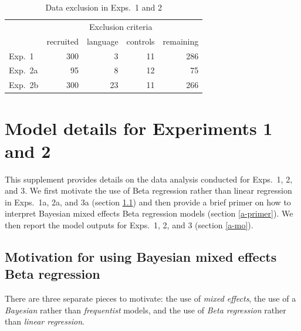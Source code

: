 \documentclass[11pt,fleqn]{article}
\newcommand{\6}{\mbox{$[\hspace*{-.6mm}[$}}
\newcommand{\9}{\mbox{$]\hspace*{-.6mm}]$}}
\begin{document}

\begin{table}[h!]
\centering
\begin{tabular}{l r | r r | r}
&  & \multicolumn{2}{c|}{Exclusion criteria} &  \\ 
&  recruited  & language & controls & remaining \\ 
\hline
Exp.~1 & 300 & 3 & 11 & 286 \\
Exp.~2a & 95 & 8 & 12 & 75 \\
Exp.~2b & 300 & 23 & 11 & 266 \\
\end{tabular}
\caption{Data exclusion in Exps.~1 and 2}\label{f-exclusion}
\end{table} 

\section{Model details for Experiments 1 and 2}\label{modeldetails}

This supplement provides details on the data analysis conducted for Exps.~1, 2, and 3. We first motivate the use of Beta regression rather than linear regression in Exps.~1a, 2a, and 3a (section \ref{a-motivation}) and then provide a brief primer on how to interpret Bayesian mixed effects Beta regression models (section \ref{a-primer}). We then report the model outputs for Exps.~1, 2, and 3 (section \ref{a-mo}).

\subsection{Motivation for using Bayesian mixed effects Beta regression}\label{a-motivation}

There are three separate pieces to motivate: the use of \emph{mixed effects}, the use of a \emph{Bayesian} rather than \emph{frequentist} models, and the use of \emph{Beta regression} rather than \emph{linear regression}. 
\end{document}

